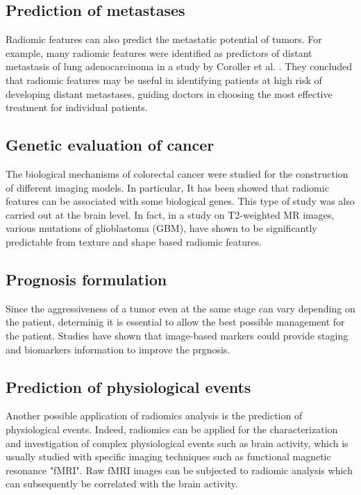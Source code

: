 \documentclass[12pt,a4paper]{report}
\begin{document}
\subsection{Prediction of metastases}

Radiomic features can also predict the metastatic potential of tumors. 
For example, many radiomic features were identified as predictors of distant metastasis of lung adenocarcinoma in a study by Coroller et al. \cite{Coroller}. They concluded that radiomic features may be useful in identifying patients at high risk of developing distant metastases, guiding doctors in choosing the most effective treatment for individual patients\cite{tesicoppola}.


\subsection{Genetic evaluation of cancer}

The biological mechanisms of colorectal cancer were studied for the construction of different imaging models. In particular, It has been showed that radiomic features can be associated with some biological genes\cite{tesicoppola}. This type of study was also carried out at the brain level. In fact, in a study on T2-weighted MR images, various mutations of glioblastoma (GBM), have shown to be significantly predictable from texture and shape based radiomic features\cite{glioblastoma}.

\subsection{Prognosis formulation}

Since the aggressiveness of a tumor even at the same stage can vary depending on the patient, determinig it is essential to allow the best possible management for the patient. Studies have shown that image-based markers could provide staging and biomarkers information to improve the prgnosis\cite{tesicoppola}.


\subsection{Prediction of physiological events}

Another possible application of radiomics analysis is the prediction of physiological events. Indeed, radiomics can be applied for the characterization and investigation of complex physiological events such as brain activity, which is usually studied with specific imaging techniques such as functional magnetic resonance "fMRI". Raw fMRI images can be subjected to radiomic analysis which can subsequently be correlated with the brain activity\cite{tesicoppola}.
\end{document}
